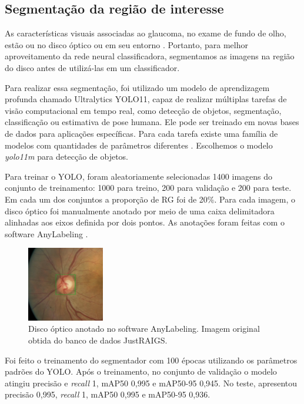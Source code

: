 \documentclass[12pt]{article}
\begin{document}
\subsection{Segmentação da região de interesse}
\label{sec:segmentation}

As características visuais associadas ao glaucoma, no exame de fundo de olho, estão ou no disco óptico ou em seu entorno \cite{weinreb_2016}. Portanto, para melhor aproveitamento da rede neural classificadora, segmentamos as imagens na região do disco antes de utilizá-las em um classificador.

Para realizar essa segmentação, foi utilizado um modelo de aprendizagem profunda chamado Ultralytics YOLO11, capaz de realizar múltiplas tarefas de visão computacional em tempo real, como detecção de objetos, segmentação, classificação ou estimativa de pose humana. Ele pode ser treinado em novas bases de dados para aplicações específicas. Para cada tarefa existe uma família de modelos com quantidades de parâmetros diferentes \cite{YOLO_2023}. Escolhemos o modelo \emph{yolo11m} para detecção de objetos.

Para treinar o YOLO, foram aleatoriamente selecionadas 1400 imagens do conjunto de treinamento: 1000 para treino, 200 para validação e 200 para teste. Em cada um dos conjuntos a proporção de RG foi de 20\%. Para cada imagem, o disco óptico foi manualmente anotado por meio de uma caixa delimitadora alinhadas aos eixos definida por dois pontos. As anotações foram feitas com o software AnyLabeling \cite{anylabeling}.

\begin{figure}[htb]
 \centering
 \includegraphics[width=0.3\textwidth]{images/disk_labeling.png}
 \caption{Disco óptico anotado no software AnyLabeling. Imagem original obtida do banco de dados JustRAIGS.}
 \label{fig:disk_labeling}
\end{figure}

Foi feito o treinamento do segmentador com 100 épocas utilizando os parâmetros padrões do YOLO. Após o treinamento, no conjunto de validação o modelo atingiu precisão e \emph{recall} 1, mAP50 0,995 e mAP50-95 0,945. No teste, apresentou precisão 0,995, \emph{recall} 1, mAP50 0,995 e mAP50-95 0,936.
\end{document}
